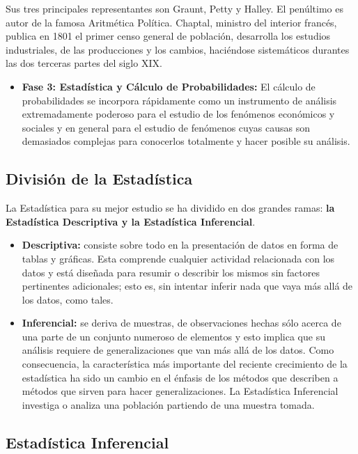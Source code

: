 Sus tres principales representantes son Graunt, Petty y Halley. El pen\'ultimo es autor de la famosa Aritm\'etica Pol\'itica. Chaptal, ministro del interior franc\'es, publica en 1801 el primer censo general de poblaci\'on, desarrolla los estudios industriales, de las producciones y los cambios, haci\'endose sistem\'aticos durantes las dos terceras partes del siglo XIX.

\begin{itemize}
    \item \textbf{Fase 3: Estad\'istica y C\'alculo de Probabilidades:} El c\'alculo de probabilidades se incorpora r\'apidamente como un instrumento de an\'alisis extremadamente poderoso para el estudio de los fen\'omenos econ\'omicos y sociales y en general para el estudio de fen\'omenos cuyas causas son demasiados complejas para conocerlos totalmente y hacer posible su an\'alisis.
\end{itemize}

\subsection{Divisi\'on de la Estad\'istica}

La Estad\'istica para su mejor estudio se ha dividido en dos grandes ramas: \textbf{la Estad\'istica Descriptiva y la Estad\'istica Inferencial}.

\begin{itemize}
    \item \textbf{Descriptiva:} consiste sobre todo en la presentaci\'on de datos en forma de tablas y gr\'aficas. Esta comprende cualquier actividad relacionada con los datos y est\'a dise\~nada para resumir o describir los mismos sin factores pertinentes adicionales; esto es, sin intentar inferir nada que vaya m\'as all\'a de los datos, como tales.
    \item \textbf{Inferencial:} se deriva de muestras, de observaciones hechas s\'olo acerca de una parte de un conjunto numeroso de elementos y esto implica que su an\'alisis requiere de generalizaciones que van m\'as all\'a de los datos. Como consecuencia, la caracter\'istica m\'as importante del reciente crecimiento de la estad\'istica ha sido un cambio en el \'enfasis de los m\'etodos que describen a m\'etodos que sirven para hacer generalizaciones. La Estad\'istica Inferencial investiga o analiza una poblaci\'on partiendo de una muestra tomada.
\end{itemize}

\subsection{Estad\'istica Inferencial}

